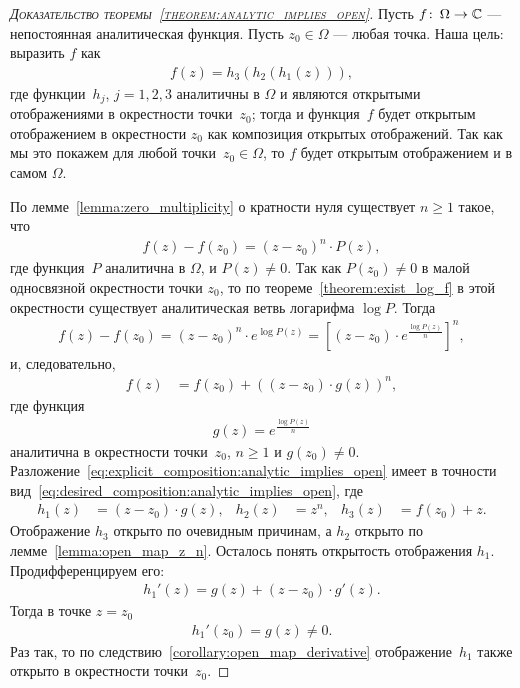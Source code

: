 \documentclass[../complex-analysis.tex]{subfiles}
\begin{document}
  \begin{proof}[\normalfont\textsc{Доказательство теоремы~\ref{theorem:analytic_implies_open}}]
   Пусть $ f \colon\,\Omega\to\mathbb{C} $ --- непостоянная аналитическая функция. Пусть $ z_0 \in \Omega $ --- любая точка. Наша цель: выразить $ f $ как
   \begin{align}
    \label{eq:desired_composition:analytic_implies_open}
    f(z) = h_3(h_2(h_1(z))),
   \end{align} где функции~$ h_j $, $ j=1,2,3 $ аналитичны в $ \Omega $ и являются открытыми отображениями в окрестности точки~$ z_0 $; тогда и функция~$ f $ будет открытым отображением в окрестности $ z_0 $ как композиция открытых отображений. Так как мы это покажем для любой точки~$ z_0\in\Omega $, то $ f $ будет открытым отображением и в самом $ \Omega $.

   По лемме~\ref{lemma:zero_multiplicity} о кратности нуля существует $ n \geqslant 1 $ такое, что
   \begin{align*}
    f(z) - f(z_0) = (z - z_0)^{n} \cdot P(z),
   \end{align*} где функция~$ P $ аналитична в $ \Omega $, и $ P(z) \neq 0 $. Так как $ P(z_0) \neq 0 $ в малой односвязной окрестности точки $ z_0 $, то по теореме~\ref{theorem:exist_log_f} в этой окрестности существует аналитическая ветвь логарифма $ \log P $. Тогда
   \begin{align*}
    f(z) - f(z_0) = (z - z_0)^{n} \cdot e^{\log P(z)} = \left[ \left( z-z_0 \right) \cdot e^{\frac{\log P(z)}{n}} \right]^{n},
   \end{align*} и, следовательно,
   \begin{align}
    \label{eq:explicit_composition:analytic_implies_open}
    f(z) &= f(z_0) + ((z-z_0) \cdot g(z))^{n},
   \end{align} где функция
   \begin{align*}
    g(z) = e^{\frac{\log P(z)}{n}}
   \end{align*} аналитична в окрестности точки~$ z_0 $, $ n \geqslant 1 $ и $ g(z_0) \neq 0 $. Разложение~\eqref{eq:explicit_composition:analytic_implies_open} имеет в точности вид~\eqref{eq:desired_composition:analytic_implies_open}, где
   \begin{align*}
    h_1(z) &= (z - z_0) \cdot g(z), & h_2(z) &= z^{n}, & h_3(z) &= f(z_0) + z.
   \end{align*} Отображение $ h_3 $ открыто по очевидным причинам, а $ h_2 $ открыто по лемме~\ref{lemma:open_map_z_n}. Осталось понять открытость отображения $ h_1 $. Продифференцируем его:
   \begin{align*}
    h_1'(z) = g(z) + (z - z_0) \cdot g'(z).
   \end{align*} Тогда в точке $ z = z_0 $
   \begin{align*}
    h_1'(z_0) = g(z) \neq 0.
   \end{align*} Раз так, то по следствию~\ref{corollary:open_map_derivative} отображение~$ h_1 $ также открыто в окрестности точки~$ z_0 $.
  \end{proof}

  
\end{document}

